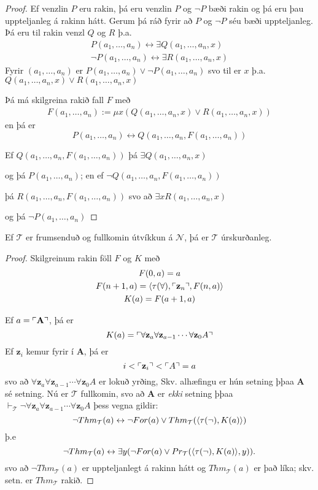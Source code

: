 \documentclass[12pt]{book}
\newcommand{\cT}{\mathcal{T}}
\newcommand{\cN}{\mathcal{N}}
\newcommand{\bA}{\mathbf{A}}
\newcommand{\bz}{\mathbf{z}}
\newcommand{\aan}{a_1, \dotsc, a_n}
\newcommand{\vT}{\vdash_{\cT}}
\DeclarePairedDelimiter{\god}{\ulcorner}{\urcorner}
\begin{document}
\begin{proof}
  Ef venzlin $P$ eru rakin, þá  eru venzlin $P$ og $\lnot P$ bæði rakin
  og þá eru þau uppteljanleg á rakinn hátt. Gerum þá ráð fyrir að
  $P$ og $\lnot P$ séu bæði uppteljanleg. Þá eru til rakin venzl $Q$ og $R$ þ.a.
  \begin{gather*}
    P(\aan) \leftrightarrow \exists Q(\aan,x)\\
    \lnot P(\aan) \leftrightarrow \exists R(\aan,x)
  \end{gather*}
  Fyrir $(\aan)$ er $P(\aan) \vee \lnot P(\aan)$
  svo til er $x$ þ.a. $Q(\aan,x)\vee R(\aan,x)$

  Þá má skilgreina rakið fall $F$ með
  \begin{gather*}
    F(\aan) := \mu x(Q(\aan,x)\vee R(\aan,x))
  \end{gather*}
  en þá er
  \[ P(\aan) \leftrightarrow Q(\aan,F(\aan))\]

  Ef $ Q(\aan,F(\aan))$ þá $\exists Q(\aan,x)$
  
  og þá $P(\aan)$; en ef $\lnot Q(\aan,F(\aan))$

  þá $R(\aan,F(\aan))$ svo að $\exists x R(\aan,x)$

  og þá $\lnot P(\aan)$
\end{proof}

\begin{setn}
  Ef $\cT$ er frumsenduð og fullkomin útvíkkun á $\cN$, þá er $\cT$ úrskurðanleg.
\end{setn}

\begin{proof}
  Skilgreinum rakin föll $F$ og $K$ með
  \begin{gather*}
    F(0,a) = a\\
    F(n+1,a) = \braket{\tau(\forall),\god{\bz_n},F(n,a)}\\
    K(a) = F(a+1, a)
  \end{gather*}

  Ef $a = \god{\bA}$, þá er
  \[K(a) = \god{\forall \bz_a \forall\bz_{a-1} \dotsb \forall \bz_0 A }\]
  Ef $\bz_i$ kemur fyrir í $\bA$, þá er
  \[ i < \god{\bz_i} < \god{A} = a \]
  svo að $\forall \bz_a \forall\bz_{a-1} \dotsb \forall \bz_0 A $ er 
  lokuð yrðing, Skv. alhæfingu er hún setning þþaa $\bA$ sé setning.
  Nú er $\cT$ fullkomin, svo að $\bA$ er \emph{ekki} setning
  þþaa $ \vT \lnot \forall \bz_a \forall\bz_{a-1} \dotsb \forall \bz_0 A $
  þess vegna gildir:
  \[ \lnot Thm_{\cT}(a) \leftrightarrow \lnot For(a) \vee Thm_{\cT} (\braket{ \tau(\lnot), K(a)}) \]
  þ.e 
  \[ \lnot Thm_{\cT}(a) \leftrightarrow \exists y( \lnot For(a) \vee Pr_{\cT} (\braket{ \tau(\lnot), K(a)},y)). \]
  svo að $\lnot Thm_{\cT} (a)$ er uppteljanlegt á rakinn hátt og
  $Thm_{\cT} (a)$ er það líka; skv. setn. er $Thm_{\cT}$ rakið.
\end{proof}
\end{document}
